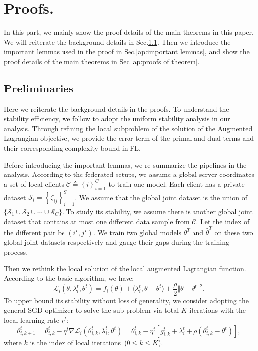 \newpage
\section{Proofs.}
\label{ap:proof}

In this part, we mainly show the proof details of the main theorems in this paper. We will reiterate the background details in Sec.\ref{ap:preliminaries}. Then we introduce the important lemmas used in the proof in Sec.\ref{ap:important lemmas}, and show the proof details of the main theorems in  Sec.\ref{ap:proofs of theorem}.

\subsection{Preliminaries}
\label{ap:preliminaries}

Here we reiterate the background details in the proofs. To understand the stability efficiency, we follow \citet{hardt2016train,lei2020fine,zhou2021towards,sun2023understanding} to adopt the uniform stability analysis in our analysis. Through refining the local subproblem of the solution of the Augmented Lagrangian objective, we provide the error term of the primal and dual terms and their corresponding complexity bound in FL.

Before introducing the important lemmas, we re-summarize the pipelines in the analysis. According to the federated setups, we assume a global server coordinates a set of local clients $\mathcal{C}\triangleq\left\{i\right\}_{i=1}^C$ to train one model. Each client has a private dataset $\mathcal{S}_i=\left\{\zeta_{ij}\right\}_{j=1}^S$. We assume that the global joint dataset is the union of $\{\mathcal{S}_1\cup\mathcal{S}_2\cup\cdots\cup\mathcal{S}_C\}$. To study its stability, we assume there is another global joint dataset that contains at most one different data sample from $\mathcal{C}$. Let the index of the different pair be $(i^\star,j^\star)$. We train two global models $\theta^T$ and $\hat{\theta}^T$ on these two global joint datasets respectively and gauge their gaps during the training process.

Then we rethink the local solution of the local augmented Lagrangian function. According to the basic algorithm, we have:
\begin{equation}
    \mathcal{L}_i(\theta, \lambda_i^t, \theta^t) = f_i(\theta) + \langle\lambda_i^t, \theta - \theta^t\rangle + \frac{\rho}{2}\Vert \theta - \theta^t\Vert^2.
\end{equation}
To upper bound its stability without loss of generality, we consider adopting the general SGD optimizer to solve the sub-problem via total $K$ iterations with the local learning rate $\eta^t$:
\begin{equation}
\label{ap:eq:update}
    \theta_{i,k+1}^t = \theta_{i,k}^t - \eta^t\nabla \mathcal{L}_i(\theta_{i,k}^t, \lambda_i^t, \theta^t) = \theta_{i,k}^t - \eta^t\left[g_{i,k}^t + \lambda_i^t + \rho\left(\theta_{i,k}^t - \theta^t\right)\right],
\end{equation}
where $k$ is the index of local iterations~($0\leq k\leq K$).

